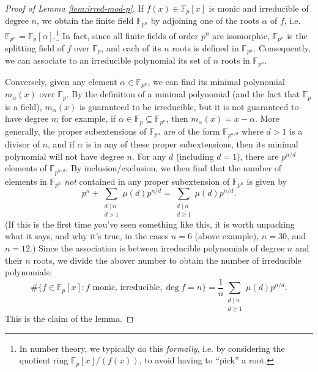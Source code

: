 \documentclass[12pt]{amsart}
\theoremstyle{definition} \newtheorem*{notation}{Notation}
\theoremstyle{remark} \newtheorem*{remark}{Remark}
\theoremstyle{remark} \newtheorem*{example}{Example}
\theoremstyle{definition} \newtheorem*{definition}{Definition}
\numberwithin{equation}{section}
\numberwithin{theorem}{section}
\begin{document}
	
	\begin{proof}[Proof of Lemma \ref{lem:irred-mod-p}]
		If $f(x) \in \mathbb{F}_p[x]$ is monic and irreducible of degree $n$, we obtain the finite field $\mathbb{F}_{p^n}$ by adjoining one of the roots $\alpha$ of $f$, i.e. $\mathbb{F}_{p^n} = \mathbb{F}_p[\alpha]$.\footnote{In number theory, we typically do this \emph{formally}, i.e. by considering the quotient ring $\mathbb{F}_p[x] / (f(x))$, to avoid having to ``pick'' a root.}  In fact, since all finite fields of order $p^n$ are isomorphic, $\mathbb{F}_{p^n}$ is the splitting field of $f$ over $\mathbb{F}_p$, and each of its $n$ roots is defined in $\mathbb{F}_{p^n}$.  Consequently, we can associate to an irreducible polynomial its set of $n$ roots in $\mathbb{F}_{p^n}$.
		
		Conversely, given any element $\alpha \in \mathbb{F}_{p^n}$, we can find its minimal polynomial $m_\alpha(x)$ over $\mathbb{F}_p$.  By the definition of a minimal polynomial (and the fact that $\mathbb{F}_p$ is a field), $m_\alpha(x)$ is guaranteed to be irreducible, but it is not guaranteed to have degree $n$; for example, if $\alpha \in \mathbb{F}_p \subseteq \mathbb{F}_{p^n}$, then $m_\alpha(x) = x-\alpha$.  More generally, the proper subextensions of $\mathbb{F}_{p^n}$ are of the form $\mathbb{F}_{p^{n/d}}$ where $d > 1$ is a divisor of $n$, and if $\alpha$ is in any of these proper subextensions, then its minimal polynomial will not have degree $n$.  For any $d$ (including $d=1$), there are $p^{n/d}$ elements of $\mathbb{F}_{p^{n/d}}$.  By inclusion/exclusion, we then find that the number of elements in $\mathbb{F}_{p^n}$ \emph{not} contained in any proper subextension of $\mathbb{F}_{p^n}$ is given by
			\[
				p^n + \sum_{\substack{d \mid n \\ d > 1}} \mu(d) p^{n/d}
					= \sum_{\substack{d \mid n \\ d \geq 1}} \mu(d) p^{n/d}.
			\]
		(If this is the first time you've seen something like this, it is worth unpacking what it says, and why it's true, in the cases $n=6$ (above example), $n=30$, and $n=12$.)  Since the association is between irreducible polynomials of degree $n$ and their $n$ roots, we divide the abover number to obtain the number of irreducible polynomials:
			\[
				\#\{f \in \mathbb{F}_p[x] : f \text{ monic, irreducible}, \deg f = n\}
					= \frac{1}{n} \sum_{\substack{d \mid n \\ d \geq 1}} \mu(d) p^{n/d}.
			\]
		This is the claim of the lemma.
	\end{proof}
	
\end{document}
